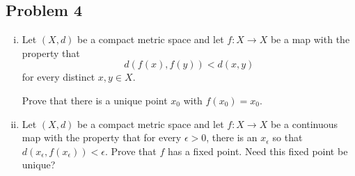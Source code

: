 \documentclass[12pt]{article}
\newcommand\paren[1]{\left( #1 \right)}
\theoremstyle{definition}
\begin{document}
\subsection{Problem 4 \texorpdfstring{\cite{Munkres}}{}}
\begin{enumerate}[(i)]
    \item Let $(X,d)$ be a compact metric space and let $f : X \to X$ be a map with the property that 
    \[
        d \paren{ f(x) , f(y) } < d(x,y)
    \]
    for every distinct $x , y \in X$.
    
    Prove that there is a unique point $x_0$ with $f(x_0) = x_0$.
    \item Let $(X,d)$ be a compact metric space and let $f : X \to X$ be a continuous map with the property that for every $\epsilon > 0$, there is an $x_{\epsilon}$ so that $d \paren{ x_{\epsilon} , f(x_{\epsilon}) } < \epsilon$. Prove that $f$ has a fixed point. Need this fixed point be unique?
\end{enumerate}
\end{document}
